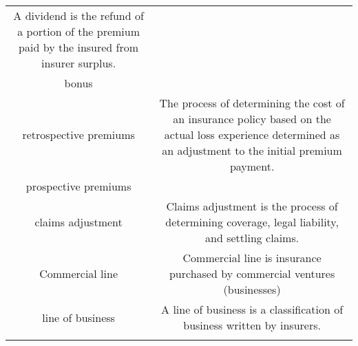 \documentclass[
]{book}
\begin{document}
\begin{longtable}[]{@{}cc@{}}
\begin{minipage}[t]{0.43\columnwidth}
A dividend is the refund of a
portion of the premium paid by
the insured from insurer
surplus.\strut
\end{minipage}\tabularnewline
\begin{minipage}[t]{0.39\columnwidth}\centering
bonus\strut
\end{minipage} & \begin{minipage}[t]{0.43\columnwidth}\centering
\strut
\end{minipage}\tabularnewline
\begin{minipage}[t]{0.39\columnwidth}\centering
retrospective premiums\strut
\end{minipage} & \begin{minipage}[t]{0.43\columnwidth}\centering
The process of determining the
cost of an insurance policy
based on the actual loss
experience determined as an
adjustment to the initial
premium payment.\strut
\end{minipage}\tabularnewline
\begin{minipage}[t]{0.39\columnwidth}\centering
prospective premiums\strut
\end{minipage} & \begin{minipage}[t]{0.43\columnwidth}\centering
\strut
\end{minipage}\tabularnewline
\begin{minipage}[t]{0.39\columnwidth}\centering
claims adjustment\strut
\end{minipage} & \begin{minipage}[t]{0.43\columnwidth}\centering
Claims adjustment is the
process of determining
coverage, legal liability, and
settling claims.\strut
\end{minipage}\tabularnewline
\begin{minipage}[t]{0.39\columnwidth}\centering
Commercial line\strut
\end{minipage} & \begin{minipage}[t]{0.43\columnwidth}\centering
Commercial line is insurance
purchased by commercial
ventures (businesses)\strut
\end{minipage}\tabularnewline
\begin{minipage}[t]{0.39\columnwidth}\centering
line of business\strut
\end{minipage} & \begin{minipage}[t]{0.43\columnwidth}\centering
A line of business is a
classification of business
written by insurers.\strut
\end{minipage}\tabularnewline
\begin{minipage}[t]{0.39\columnwidth}\centering

\end{minipage}
\end{longtable}
\end{document}
